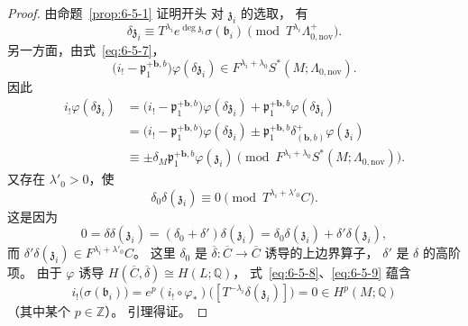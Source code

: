 \begin{proof}
由命题~\ref{prop:6-5-1} 证明开头
对 $\mathfrak z_i$ 的选取，
有
\[
\delta\mathfrak z_i
\equiv
T^{\lambda_i}e^{\deg\mathfrak z_i}
\sigma(\mathfrak b_i)
\pmod{T^{\lambda_i}\Lambda_{0,\mathrm{nov}}^+}.
\]
另一方面，由式~\eqref{eq:6-5-7}，
\[
\bigl(i_!-\mathfrak p_1^{+\boldsymbol b,b}\bigr)
\varphi(\delta\mathfrak z_i)
\in F^{\lambda_i+\lambda_0}
S^*(M;\Lambda_{0,\mathrm{nov}}).
\]
因此
\begin{equation}
\begin{aligned}
i_!\varphi(\delta\mathfrak z_i)
&=\bigl(i_!-\mathfrak p_1^{+\boldsymbol b,b}\bigr)
\varphi(\delta\mathfrak z_i)
+\mathfrak p_1^{+\boldsymbol b,b}
\varphi(\delta\mathfrak z_i)\\
&=\bigl(i_!-\mathfrak p_1^{+\boldsymbol b,b}\bigr)
\varphi(\delta\mathfrak z_i)
\pm\mathfrak p_1^{+\boldsymbol b,b}
\delta^+_{(\boldsymbol b,b)}\varphi(\mathfrak z_i)\\
&\equiv
\pm\delta_M\mathfrak p_1^{+\boldsymbol b,b}
\varphi(\mathfrak z_i)
\pmod{F^{\lambda_i+\lambda_0}
S^*(M;\Lambda_{0,\mathrm{nov}})}.
\end{aligned}
\tag{6.5.8}\label{eq:6-5-8}
\end{equation}
又存在 $\lambda'_0>0$，使
\begin{equation}
\delta_0\delta(\mathfrak z_i)
\equiv0
\pmod{T^{\lambda_i+\lambda'_0}C}.
\tag{6.5.9}\label{eq:6-5-9}
\end{equation}
这是因为
\[
0=\delta\delta(\mathfrak z_i)
=(\delta_0+\delta')\delta(\mathfrak z_i)
=\delta_0\delta(\mathfrak z_i)
+\delta'\delta(\mathfrak z_i),
\]
而
$\delta'\delta(\mathfrak z_i)
\in F^{\lambda_i+\lambda'_0}C$。
这里 $\delta_0$ 是
$\overline\delta:\overline C\to\overline C$
诱导的上边界算子，
$\delta'$ 是 $\delta$ 的高阶项。
由于 $\varphi$ 诱导
$H(\overline C,\overline\delta)
\cong H(L;\mathbb Q)$，
式~\eqref{eq:6-5-8}、\eqref{eq:6-5-9}
蕴含
\[
i_!\bigl(\sigma(\mathfrak b_i)\bigr)
=e^p(i_!\circ\varphi_*)
\bigl([T^{-\lambda_i}\delta(\mathfrak z_i)]\bigr)
=0\in H^p(M;\mathbb Q)
\]
（其中某个 $p\in\mathbb Z$）。
引理得证。
\end{proof}

